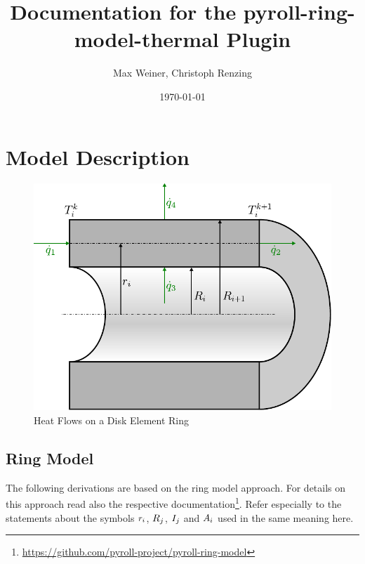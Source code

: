 \documentclass{PyRollDocs}
\begin{document}
    \title{Documentation for the pyroll-ring-model-thermal Plugin}
    \author{Max Weiner, Christoph Renzing}
    \date{\today}

    \maketitle


    \section{Model Description}\label{sec:model-description}

    \begin{figure}
        \centering
        \includegraphics[scale=0.8]{img/heat_flow}
        \caption{Heat Flows on a Disk Element Ring}
        \label{fig:heat_flow}
    \end{figure}

    \subsection{Ring Model}\label{subsec:ring-model}

    The following derivations are based on the ring model approach.
    For details on this approach read also the respective documentation\footnote{\url{https://github.com/pyroll-project/pyroll-ring-model}}.
    Refer especially to the statements about the symbols ${r}_{{i}}$, ${R}_{j}$, ${I}_{j}$ and ${A}_{i}$ used in the same meaning here.
\end{document}

